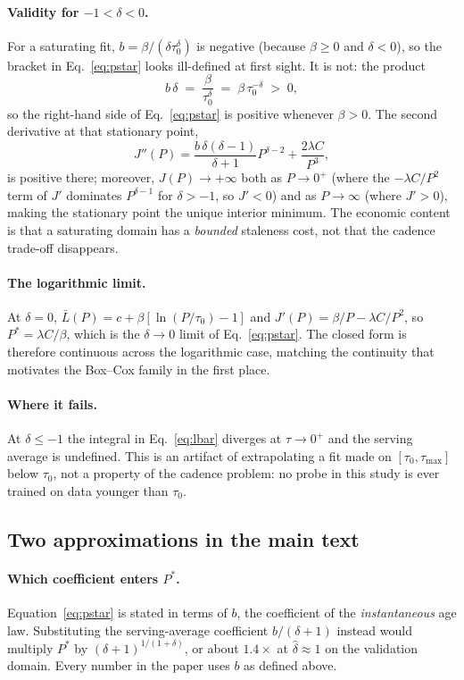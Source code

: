 \documentclass[10pt,letterpaper]{article}
\begin{document}
\paragraph{Validity for $-1 < \delta < 0$.}
For a saturating fit, $b = \beta/(\delta\tau_0^{\delta})$ is negative
(because $\beta \ge 0$ and $\delta < 0$), so the bracket in
Eq.~\eqref{eq:pstar} looks ill-defined at first sight. It is not: the
product
\[
b\,\delta \;=\; \frac{\beta}{\tau_0^{\delta}} \;=\; \beta\,\tau_0^{-\delta}
\;>\; 0 ,
\]
so the right-hand side of Eq.~\eqref{eq:pstar} is positive whenever
$\beta > 0$. The second derivative at that stationary point,
\[
J''(P) = \frac{b\,\delta(\delta-1)}{\delta+1}P^{\delta-2}
+ \frac{2\lambda C}{P^{3}},
\]
is positive there; moreover, $J(P) \to +\infty$ both as $P \to 0^{+}$ (where
the $-\lambda C / P^{2}$ term of $J'$ dominates $P^{\delta-1}$ for $\delta > -1$,
so $J' < 0$) and as $P \to \infty$ (where $J' > 0$), making the stationary
point the unique interior minimum. The economic content is that a saturating
domain has a \emph{bounded} staleness cost, not that the cadence trade-off
disappears.

\paragraph{The logarithmic limit.}
At $\delta=0$, $\bar L(P)=c+\beta[\ln(P/\tau_0)-1]$ and
$J'(P) = \beta/P - \lambda C/P^{2}$, so
$P^{\ast} = \lambda C / \beta$, which is the $\delta \to 0$ limit of
Eq.~\eqref{eq:pstar}. The closed form is therefore continuous across the
logarithmic case, matching the continuity that motivates the Box--Cox family
in the first place.

\paragraph{Where it fails.}
At $\delta \le -1$ the integral in Eq.~\eqref{eq:lbar} diverges at
$\tau \to 0^{+}$ and the serving average is undefined. This is an artifact
of extrapolating a fit made on $[\tau_0, \tau_{\max}]$ below $\tau_0$, not a
property of the cadence problem: no probe in this study is ever trained on
data younger than $\tau_0$.

\subsection{Two approximations in the main text}

\paragraph{Which coefficient enters $P^\ast$.}
Equation~\eqref{eq:pstar} is stated in terms of $b$, the coefficient of the
\emph{instantaneous} age law. Substituting the serving-average coefficient
$b/(\delta+1)$ instead would multiply $P^\ast$ by
$(\delta+1)^{1/(1+\delta)}$, or about $1.4\times$ at $\hat\delta \approx 1$
on the validation domain. Every number in the paper uses $b$ as defined
above.
\end{document}
